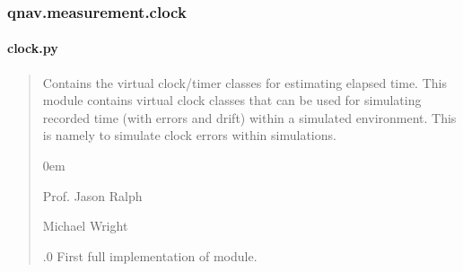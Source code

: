 \documentclass[letterpaper,10pt,english]{sphinxmanual}
\begin{document}
\begin{fulllineitems}
\begin{fulllineitems}
\begin{quote}
\begin{description}
\end{description}\end{quote}

\end{fulllineitems}


\end{fulllineitems}


\sphinxstepscope


\subsubsection{qnav.measurement.clock}
\label{\detokenize{modules/measurement/clock:module-qnav.measurement.clock}}\label{\detokenize{modules/measurement/clock:qnav-measurement-clock}}\label{\detokenize{modules/measurement/clock::doc}}

\paragraph{clock.py}
\label{\detokenize{modules/measurement/clock:clock-py}}\begin{quote}\begin{description}
\sphinxAtStartPar
Contains the virtual clock/timer classes for estimating elapsed time.
This module contains virtual clock classes that can be used for simulating
recorded time (with errors and drift) within a simulated environment. This
is namely to simulate clock errors within simulations.

\begin{DUlineblock}{0em}
\item[] Prof. Jason Ralph \sphinxhyphen{} 
\item[] Michael Wright \sphinxhyphen{} 
\end{DUlineblock}

.0 \sphinxhyphen{} First full implementation of module.

\end{description}\end{quote}
\end{document}
